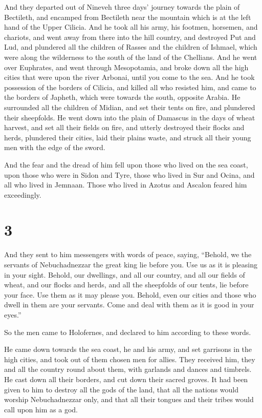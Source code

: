  And they departed out of Nineveh three days' journey
towards the plain of Bectileth, and encamped from Bectileth near the
mountain which is at the left hand of the Upper Cilicia. 
And he took all his army, his footmen, horsemen, and chariots, and went
away from there into the hill country,  and destroyed Put
and Lud, and plundered all the children of Rasses and the children of
Ishmael, which were along the wilderness to the south of the land of the
Chellians.  And he went over Euphrates, and went through
Mesopotamia, and broke down all the high cities that were upon the river
Arbonai, until you come to the sea.  And he took possession
of the borders of Cilicia, and killed all who resisted him, and came to
the borders of Japheth, which were towards the south, opposite Arabia.
 He surrounded all the children of Midian, and set their
tents on fire, and plundered their sheepfolds.  He went
down into the plain of Damascus in the days of wheat harvest, and set
all their fields on fire, and utterly destroyed their flocks and herds,
plundered their cities, laid their plains waste, and struck all their
young men with the edge of the sword.

 And the fear and the dread of him fell upon those who
lived on the sea coast, upon those who were in Sidon and Tyre, those who
lived in Sur and Ocina, and all who lived in Jemnaan. Those who lived in
Azotus and Ascalon feared him exceedingly.

\hypertarget{section-2}{%
\section{3}\label{section-2}}

 And they sent to him messengers with words of peace,
saying,  ``Behold, we the servants of Nebuchadnezzar the
great king lie before you. Use us as it is pleasing in your sight.
 Behold, our dwellings, and all our country, and all our
fields of wheat, and our flocks and herds, and all the sheepfolds of our
tents, lie before your face. Use them as it may please you. 
Behold, even our cities and those who dwell in them are your servants.
Come and deal with them as it is good in your eyes.''

 So the men came to Holofernes, and declared to him
according to these words.

 He came down towards the sea coast, he and his army, and
set garrisons in the high cities, and took out of them chosen men for
allies.  They received him, they and all the country round
about them, with garlands and dances and timbrels.  He cast
down all their borders, and cut down their sacred groves. It had been
given to him to destroy all the gods of the land, that all the nations
would worship Nebuchadnezzar only, and that all their tongues and their
tribes would call upon him as a god.

